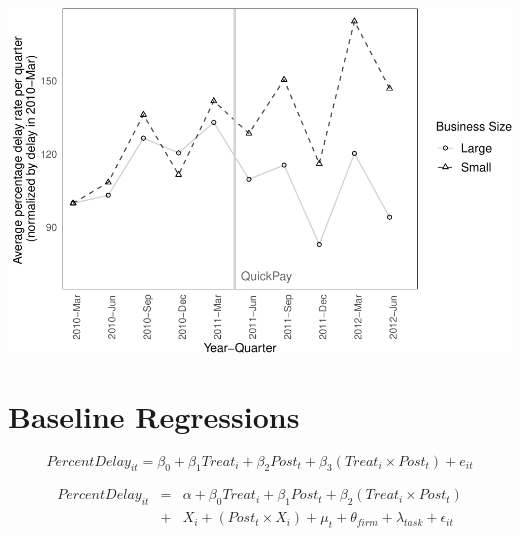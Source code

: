 \documentclass[
]{article}
\begin{document}
\includegraphics{qp_first_pc_delay-2_files/figure-latex/normalized_plot-1.pdf}

\hypertarget{baseline-regressions}{%
\section{Baseline Regressions}\label{baseline-regressions}}

\[ PercentDelay_{it} = \beta_0 + \beta_1 Treat_i + \beta_2 Post_t + \beta_3 (Treat_i \times Post_t) + e_{it}\]

\[ \begin{aligned} PercentDelay_{it} &=& \alpha+\beta_0 Treat_i + \beta_1 Post_t + \beta_2 (Treat_i \times Post_t)\\
&+&  X_i + (Post_t \times X_i) + \mu_t + \theta_{firm} + \lambda_{task}+ \epsilon_{it}
\end{aligned}\]
\end{document}

